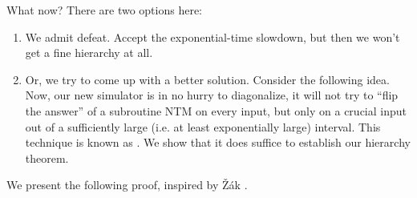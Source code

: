 \documentclass[11pt,twoside=off,numbers=noenddot]{scrbook}
\begin{document}
What now? There are two options here:
\begin{enumerate}
  \item We admit defeat. Accept the exponential-time slowdown, but then we won't get a fine hierarchy at all.
  \item Or, we try to come up with a better solution. Consider the following idea. Now, our new simulator is in no hurry to diagonalize, it will not try to ``flip the answer'' of a subroutine NTM on every input, but only on a crucial input out of a sufficiently large (i.e. at least exponentially large) interval. This technique is known as . We show that it does suffice to establish our hierarchy theorem.
\end{enumerate}

We present the following proof, inspired by Žák \cite{zak1983turing}.
\end{document}
